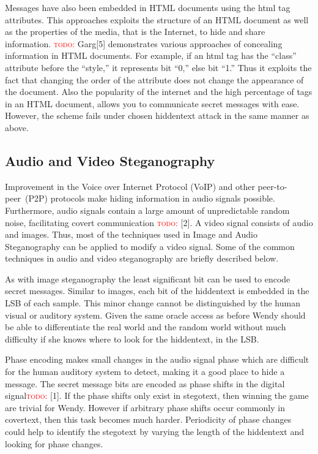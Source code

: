 \documentclass[11pt]{article}
\newcommand\todo[1]{\textcolor{red}{\textsc{todo}: #1}}
\begin{document}
Messages have also been embedded in HTML documents using the html tag
attributes. This approaches exploits the structure of an HTML document
as well as the properties of the media, that is the Internet, to hide
and share information. \todo{}Garg[5] demonstrates various approaches
of concealing information in HTML documents. For example, if an html
tag has the ``class'' attribute before the ``style,'' it represents
bit ``0,'' else bit ``1.'' Thus it exploits the fact that changing the
order of the attribute does not change the appearance of the document.
Also the popularity of the internet and the high percentage of tags in
an HTML document, allows you to communicate secret messages with ease.
However, the scheme fails under chosen hiddentext attack in the same
manner as above.

\subsection{Audio and Video Steganography}
Improvement in the Voice over Internet Protocol (VoIP) and other
peer-to-peer~(P2P) protocols make hiding information in audio signals
possible. Furthermore, audio signals contain a large amount of
unpredictable random noise, facilitating covert communication \todo{}[2]. A
video signal consists of audio and images. Thus, most of the
techniques used in Image and Audio Steganography can be applied to
modify a video signal. Some of the common techniques in audio and
video steganography are briefly described below.

As with image steganography the least significant bit can be used to
encode secret messages. Similar to images, each bit of the hiddentext
is embedded in the LSB of each sample. This minor change cannot be
distinguished by the human visual or auditory system. Given the same
oracle access as before Wendy should be able to differentiate the real
world and the random world without much difficulty if she knows where
to look for the hiddentext, in the LSB.
 
Phase encoding makes small changes in the audio signal phase which are
difficult for the human auditory system to detect, making it a good
place to hide a message. The secret message bits are encoded as phase
shifts in the digital signal\todo{} [1]. If the phase shifts only exist in
stegotext, then winning the game are trivial for Wendy. However if
arbitrary phase shifts occur commonly in covertext, then this task
becomes much harder. Periodicity of phase changes could help to
identify the stegotext by varying the length of the hiddentext and
looking for phase changes.
\end{document}

